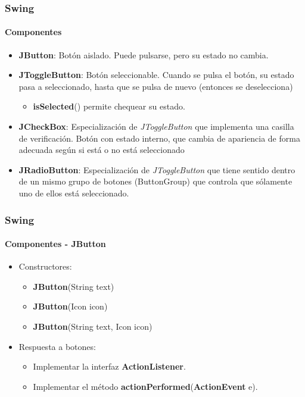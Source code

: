 \documentclass{beamer}
\begin{document}
    \begin{frame}
		\frametitle{Swing}
		\framesubtitle{Componentes}

        \begin{itemize}
		    \item[\checkmark] \textbf{JButton}: Bot\'on aislado. Puede pulsarse, pero su estado no cambia.
		    \item[\checkmark] \textbf{JToggleButton}: Bot\'on seleccionable. Cuando se pulsa el bot\'on, su estado pasa a seleccionado, hasta que se pulsa de nuevo (entonces se deselecciona)
		    \begin{itemize}
        		    \item[] \textbf{isSelected}() permite chequear su estado.
	    	    \end{itemize}
		    \item[\checkmark] \textbf{JCheckBox}: Especializaci\'on de \emph{JToggleButton} que implementa una casilla de verificaci\'on. Bot\'on con estado interno, que cambia de apariencia de forma adecuada seg\'un si est\'a o no est\'a seleccionado
		    \item[\checkmark] \textbf{JRadioButton}: Especializaci\'on de \emph{JToggleButton} que tiene sentido dentro de un mismo grupo de botones (ButtonGroup) que controla que s\'olamente uno de ellos est\'a seleccionado.
		\end{itemize}
	\end{frame}

    \begin{frame}
		\frametitle{Swing}
		\framesubtitle{Componentes - JButton}

        \begin{itemize}
		    \item[\checkmark] Constructores:
		    \begin{itemize}
        		    \item[] \textbf{JButton}(String text)
        		    \item[] \textbf{JButton}(Icon icon)
        		    \item[] \textbf{JButton}(String text, Icon icon)
	    	    \end{itemize}
		\end{itemize}

        \begin{itemize}
		    \item[\checkmark] Respuesta a botones:
		    \begin{itemize}
        		    \item[] Implementar la interfaz \textbf{ActionListener}.
        		    \item[] Implementar el m\'etodo \textbf{actionPerformed}(\textbf{ActionEvent} e).
	    	    \end{itemize}
		\end{itemize}
	\end{frame}
\end{document}
